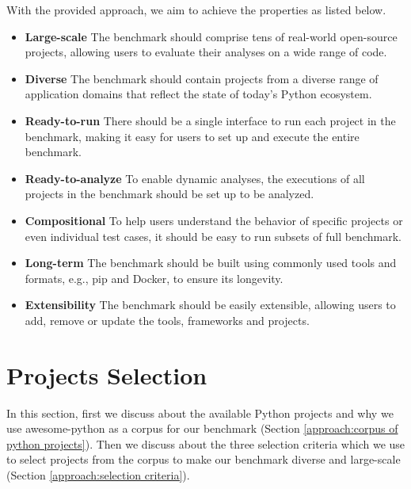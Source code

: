 With the provided approach, we aim to achieve the properties as listed below.
\begin{itemize}
    \item \textbf{Large-scale} The benchmark should comprise tens of real-world open-source projects, allowing users to evaluate their analyses on a wide range of code.
    \item \textbf{Diverse} The benchmark should contain projects from a diverse range of application domains that reflect the state of today's Python ecosystem.
    \item \textbf{Ready-to-run} There should be a single interface to run each project in the benchmark, making it easy for users to set up and execute the entire benchmark.
    \item \textbf{Ready-to-analyze} To enable dynamic analyses, the executions of all projects in the benchmark should be set up to be analyzed.
    \item \textbf{Compositional} To help users understand the behavior of specific projects or even individual test cases, it should be easy to run subsets of full benchmark.
    \item \textbf{Long-term} The benchmark should be built using commonly used tools and formats, e.g., pip and Docker, to ensure its longevity.
    \item \textbf{Extensibility} The benchmark should be easily extensible, allowing users to add, remove or update the tools, frameworks and projects.  
\end{itemize}

\section{Projects Selection}
\label{approach:project selection}
In this section, first we discuss about the available Python projects and why we use awesome-python as a corpus for our benchmark (Section \ref{approach:corpus of python projects}).
Then we discuss about the three selection criteria which we use to select projects from the corpus to make our benchmark diverse and large-scale (Section \ref{approach:selection criteria}).
